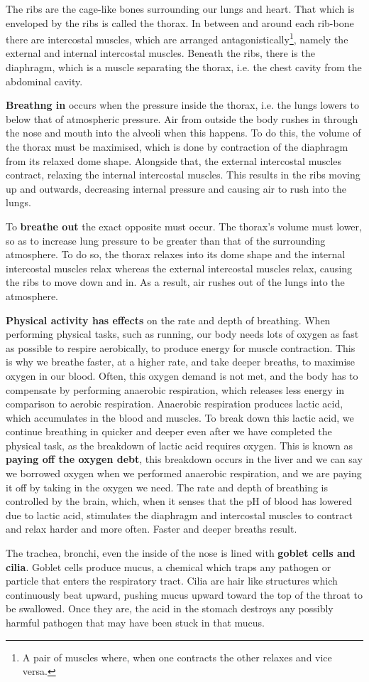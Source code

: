 The ribs are the cage-like bones surrounding our lungs and heart. That which is enveloped by the 
ribs is called the thorax. In between and around each rib-bone there are intercostal muscles, which
are arranged antagonistically\footnote{A pair of muscles where, when one contracts the other 
relaxes and vice versa.}, namely the external and internal intercostal muscles. Beneath the ribs,
there is the diaphragm, which is a muscle separating the thorax, i.e. the chest cavity from the
abdominal cavity.

\textbf{Breathng in} occurs when the pressure inside the thorax, i.e. the lungs lowers to below
that of atmospheric pressure. Air from outside the body rushes in through the nose and mouth into
the alveoli when this happens. To do this, the volume of the thorax must be maximised, which is 
done by contraction of the diaphragm from its relaxed dome shape. Alongside that, the external
intercostal muscles contract, relaxing the internal intercostal muscles. This results in the ribs
moving up and outwards, decreasing internal pressure and causing air to rush into the lungs.

To \textbf{breathe out} the exact opposite must occur. The thorax's volume must lower, so as to
increase lung pressure to be greater than that of the surrounding atmosphere. To do so, the thorax
relaxes into its dome shape and the internal intercostal muscles relax whereas the external 
intercostal muscles relax, causing the ribs to move down and in. As a result, air rushes out of the
lungs into the atmosphere.

\textbf{Physical activity has effects} on the rate and depth of breathing. When performing physical
tasks, such as running, our body needs lots of oxygen as fast as possible to respire aerobically,
to produce energy for muscle contraction. This is why we breathe faster, at a higher rate, and take
deeper breaths, to maximise oxygen in our blood.
Often, this oxygen demand is not met, and the body has to
compensate by performing anaerobic respiration, which releases less energy in comparison to aerobic
respiration. Anaerobic respiration produces lactic acid, which accumulates in the blood and 
muscles. To break down this lactic acid, we continue breathing in quicker and deeper even after we
have completed the physical task, as the breakdown of lactic acid requires oxygen. This is known 
as \textbf{paying off the oxygen debt}, this breakdown occurs in the liver and we can
say we borrowed oxygen when we performed anaerobic respiration, and we are paying it off by taking
in the oxygen we need. The rate and depth of breathing is controlled by the brain, which, when it
senses that the pH of blood has lowered due to lactic acid, stimulates the diaphragm and 
intercostal muscles to contract and relax harder and more often. Faster and deeper breaths result.

The trachea, bronchi, even the inside of the nose is lined with \textbf{goblet cells and cilia}.
Goblet cells produce mucus, a chemical which traps any pathogen or particle that enters the 
respiratory tract. Cilia are hair like structures which continuously beat upward, pushing mucus
upward toward the top of the throat to be swallowed. Once they are, the acid in the stomach 
destroys any possibly harmful pathogen that may have been stuck in that mucus.
